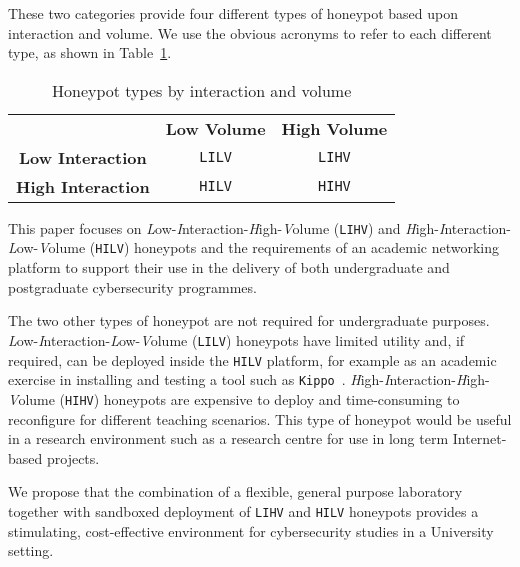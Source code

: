 \documentclass{ieeeaccess}
\begin{document}
These two categories provide four different types of honeypot based upon
interaction and volume. We use the obvious acronyms to refer to each different
type, as shown in Table~\ref{table:HoneypotTypes}.

\begin{table}[ht]
\caption{Honeypot types by interaction and volume\label{table:HoneypotTypes}}
\begin{center}
\setlength\doublerulesep{0.5pt}
\begin{tabular}{| c || c| c |}
\hline
 & \textbf{Low Volume} & \textbf{High Volume} \\
\hhline{|=||=|=|}
\textbf{Low Interaction} & \texttt{LILV} & \texttt{LIHV} \\
\hline
\textbf{High Interaction} & \texttt{HILV} & \texttt{HIHV} \\
\hline
\end{tabular}
\end{center}
\end{table}

This paper focuses on \emph{L}ow-\emph{I}nteraction-\emph{H}igh-\emph{V}olume
(\texttt{LIHV}) and \emph{H}igh-\emph{I}nteraction-\emph{L}ow-\emph{V}olume
(\texttt{HILV}) honeypots and the requirements of an academic networking
platform to support their use in the delivery of both undergraduate and
postgraduate cybersecurity programmes.

The two other types of honeypot are not required for undergraduate purposes.
\emph{L}ow-\emph{I}nteraction-\emph{L}ow-\emph{V}olume (\texttt{LILV})
honeypots have limited utility and, if required,  can be deployed inside the
\texttt{HILV} platform, for example as an academic exercise in installing and
testing a tool such as \texttt{Kippo}~\cite{SH:15}.
\emph{H}igh-\emph{I}nteraction-\emph{H}igh-\emph{V}olume (\texttt{HIHV})
honeypots are expensive to deploy and time-consuming to reconfigure for
different teaching scenarios. This type of honeypot would be useful in a
research environment such as a research centre for use in long term
Internet-based projects. 

We propose that the combination of a flexible, general purpose laboratory
together with sandboxed deployment of \texttt{LIHV} and \texttt{HILV} honeypots provides 
a stimulating, cost-effective environment for cybersecurity studies
in a University setting.
\end{document}
